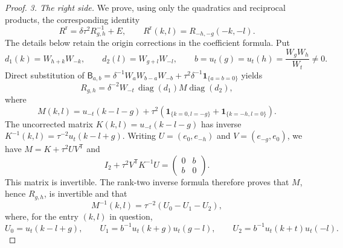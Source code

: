 \documentclass[11pt]{article}
\numberwithin{equation}{section}
\theoremstyle{definition}
\theoremstyle{remark}
\newcommand{\ind}[1]{\mathbf1_{\{#1\}}}
\begin{document}
\begin{proof}
\emph{3. The right side.} We prove, using only the quadratics and
reciprocal products, the corresponding identity
\begin{equation}\label{allodd:right-inverse}
 R^{\mathrm r}=\delta\tau^2 R_{g,h}^{-1}+E,
 \qquad
 R^{\mathrm r}(k,l)=R_{-h,-g}(-k,-l).
\end{equation}
The details below retain the origin corrections in the coefficient formula.
Put
\[
 d_1(k)=W_{h+k}W_{-k},\qquad d_2(l)=W_{g+l}W_{-l},
 \qquad b=u_t(g)=u_t(h)=\frac{W_gW_h}{W_t}\ne0.
\]
Direct substitution of
$\mathsf B_{a,b}=\delta^{-1}W_aW_{b-a}W_{-b}
+\tau^2\delta^{-1}\ind{a=b=0}$ yields
\begin{equation}\label{allodd:right-factor}
 R_{g,h}=\delta^{-2}W_{-t}\,
                   \operatorname{diag}(d_1)M\operatorname{diag}(d_2),
\end{equation}
where
\[
 M(k,l)=u_{-t}(k-l-g)
       +\tau^2(\ind{k=0,l=-g}+\ind{k=-h,l=0}).
\]
The uncorrected matrix $K(k,l)=u_{-t}(k-l-g)$ has inverse
$K^{-1}(k,l)=\tau^{-2}u_t(k-l+g)$.
Writing $U=(e_0,e_{-h})$ and $V=(e_{-g},e_0)$, we have
$M=K+\tau^2 UV^{\mathsf T}$ and
\[
 I_2+\tau^2V^{\mathsf T}K^{-1}U=
       \begin{pmatrix}0&b\\b&0\end{pmatrix}.
\]
This matrix is invertible.  The rank-two inverse formula therefore
proves that $M$, hence $R_{g,h}$, is invertible and that
\begin{equation}\label{allodd:woodbury}
 M^{-1}(k,l)=\tau^{-2}(U_0-U_1-U_2),
\end{equation}
where, for the entry $(k,l)$ in question,
\[
 U_0=u_t(k-l+g),\qquad
 U_1=b^{-1}u_t(k+g)u_t(g-l),\qquad
 U_2=b^{-1}u_t(k+t)u_t(-l).
\]


\end{proof}
\end{document}
